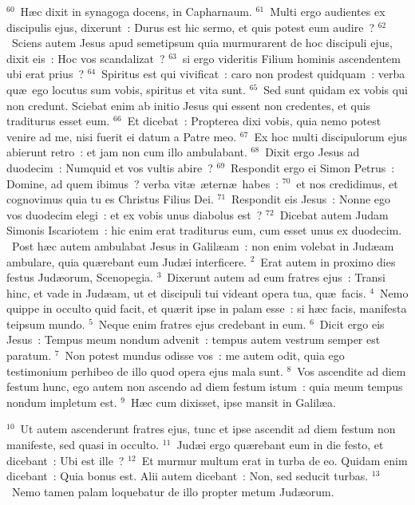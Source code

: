 ${}^{60}$~H\ae c dixit in synagoga docens, in Capharnaum.
${}^{61}$~Multi ergo audientes ex discipulis ejus, dixerunt~: Durus est hic sermo, et quis potest eum audire~?
${}^{62}$~Sciens autem Jesus apud semetipsum quia murmurarent de hoc discipuli ejus, dixit eis~: Hoc vos scandalizat~?
${}^{63}$~si ergo videritis Filium hominis ascendentem ubi erat prius~?
${}^{64}$~Spiritus est qui vivificat~: caro non prodest quidquam~: verba qu\ae\ ego locutus sum vobis, spiritus et vita sunt.
${}^{65}$~Sed sunt quidam ex vobis qui non credunt. Sciebat enim ab initio Jesus qui essent non credentes, et quis traditurus esset eum.
${}^{66}$~Et dicebat~: Propterea dixi vobis, quia nemo potest venire ad me, nisi fuerit ei datum a Patre meo.
${}^{67}$~Ex hoc multi discipulorum ejus abierunt retro~: et jam non cum illo ambulabant.
${}^{68}$~Dixit ergo Jesus ad duodecim~: Numquid et vos vultis abire~?
${}^{69}$~Respondit ergo ei Simon Petrus~: Domine, ad quem ibimus~? verba vit\ae\ \ae tern\ae\ habes~:
${}^{70}$~et nos credidimus, et cognovimus quia tu es Christus Filius Dei.
${}^{71}$~Respondit eis Jesus~: Nonne ego vos duodecim elegi~: et ex vobis unus diabolus est~?
${}^{72}$~Dicebat autem Judam Simonis Iscariotem~: hic enim erat traditurus eum, cum esset unus ex duodecim.
~\lettrine[lines=10,image=true,loversize=0.05,lraise=-0.03]{P}{}ost h\ae c autem ambulabat Jesus in Galil\ae am~: non enim volebat in Jud\ae am ambulare, quia qu\ae rebant eum Jud\ae i interficere.
${}^{2}$~Erat autem in proximo dies festus Jud\ae orum, Scenopegia.
${}^{3}$~Dixerunt autem ad eum fratres ejus~: Transi hinc, et vade in Jud\ae am, ut et discipuli tui videant opera tua, qu\ae\ facis.
${}^{4}$~Nemo quippe in occulto quid facit, et qu\ae rit ipse in palam esse~: si h\ae c facis, manifesta teipsum mundo.
${}^{5}$~Neque enim fratres ejus credebant in eum.
${}^{6}$~Dicit ergo eis Jesus~: Tempus meum nondum advenit~: tempus autem vestrum semper est paratum.
${}^{7}$~Non potest mundus odisse vos~: me autem odit, quia ego testimonium perhibeo de illo quod opera ejus mala sunt.
${}^{8}$~Vos ascendite ad diem festum hunc, ego autem non ascendo ad diem festum istum~: quia meum tempus nondum impletum est.
${}^{9}$~H\ae c cum dixisset, ipse mansit in Galil\ae a.


${}^{10}$~Ut autem ascenderunt fratres ejus, tunc et ipse ascendit ad diem festum non manifeste, sed quasi in occulto.
${}^{11}$~Jud\ae i ergo qu\ae rebant eum in die festo, et dicebant~: Ubi est ille~?
${}^{12}$~Et murmur multum erat in turba de eo. Quidam enim dicebant~: Quia bonus est. Alii autem dicebant~: Non, sed seducit turbas.
${}^{13}$~Nemo tamen palam loquebatur de illo propter metum Jud\ae orum.


